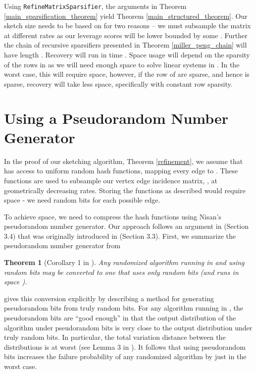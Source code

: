 \documentclass[11pt]{article}
\newtheorem{theorem}{Theorem}
\begin{document}
Using \texttt{RefineMatrixSparsifier}, the arguments in Theorem \ref{main_sparsification_theorem}
yield Theorem \ref{main_structured_theorem}. Our sketch size needs to be based on  for two reasons -- we must subsample the matrix at  different rates as our leverage scores will be lower bounded by some . Further the chain of recursive sparsifiers presented in Theorem \ref{miller_peng_chain} will have length . Recovery will run in time . Space usage will depend on the sparsity of the rows in  as we will need enough space to solve linear systems in . In the worst case, this will require  space, however, if the row of  are sparse, and hence  is sparse, recovery will take less space, specifically  with constant row sparsity. 
\section{Using a Pseudorandom Number Generator}\label{pseudorandomness}
In the proof of our sketching algorithm, Theorem \ref{refinement}, we assume that  has access to  uniform random hash functions,  mapping every edge to . These functions are used to subsample our vertex edge incidence matrix, , at geometrically decreasing rates. Storing the functions as described would require  space - we need  random bits for each possible edge. 

To achieve  space, we need to compress the hash functions using Nisan's pseudorandom number generator. Our approach follows an argument in \cite{gssss} (Section 3.4) that was originally introduced in \cite{indyk2000stable} (Section 3.3). First, we summarize the pseudorandom number generator from \cite{nisan1992pseudorandom}

\begin{theorem}[Corollary 1 in \cite{nisan1992pseudorandom}]\label{pseudorandomPrimitive}
Any randomized algorithm running in  and using  random bits may be converted to one that uses only  random bits (and runs in space ).
\end{theorem}
\cite{nisan1992pseudorandom} gives this conversion explicitly by describing a method for generating  pseudorandom bits from  truly random bits. For any algorithm running in , the pseudorandom bits are ``good enough'' in that the output distribution of the algorithm under pseudorandom bits is very close to the output distribution under truly random bits. In particular, the total variation distance between the distributions is at worst  (see Lemma 3 in \cite{nisan1992pseudorandom}). It follows that using pseudorandom bits increases the failure probability of any randomized algorithm by just  in the worst case.
\end{document}
